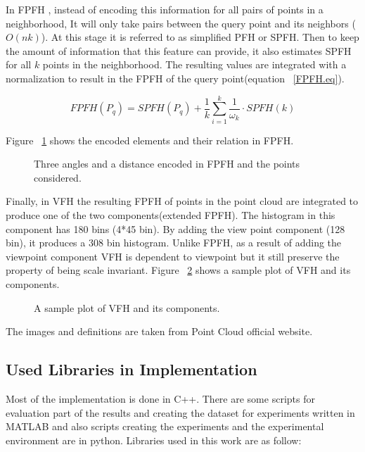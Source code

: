 In FPFH \cite{FPFH_Definition}, instead of encoding this information for all pairs of points in a neighborhood, It will only 
take pairs between the query point and its neighbors ($ O(n k) $). 
At this stage it is referred to as simplified PFH or SPFH. 
Then to keep the amount of information that this feature can provide, it also estimates SPFH for all $k$ points in the neighborhood.
The resulting values are integrated with a normalization to result in the FPFH of the query point(equation ~\ref{FPFH.eq}).

\begin{equation}
 \label{FPFH.eq}
 FPFH(P_{q}) = SPFH(P_{q}) + \frac{1}{k} \sum_{i=1}^k {\frac{1}{\omega_k}} \cdot SPFH(k)
\end{equation}


Figure  ~\ref{FPFH.figure} shows the encoded elements and their relation in FPFH.

\begin{figure}[t]
  \caption[FPFH elements.]
  {Three angles and a distance encoded in FPFH and the points considered.\cite{VFH_Definition}}
  \label{FPFH.figure}
\end{figure}

Finally, in VFH the resulting FPFH of points in the point cloud are integrated to produce one of the two components(extended FPFH).
The histogram in this component has 180 bins (4*45 bin).
By adding the view point component (128 bin), it produces a 308 bin histogram. 
Unlike FPFH, as a result of adding the viewpoint component VFH is dependent to viewpoint but it still preserve the property of 
being scale invariant. 
Figure ~\ref{VFH_plot.figure} shows a sample plot of VFH and its components.

\begin{figure}[t]
  \caption[VFH histogram]
  {A sample plot of VFH and its components.\cite{VFH_Definition}}
  \label{VFH_plot.figure}
\end{figure}

The images and definitions are taken from Point Cloud official website.

\subsection*{Used Libraries in Implementation}

Most of the implementation is done in C++. 
There are some scripts for evaluation part of the results and creating the dataset for experiments written in MATLAB and also 
scripts creating the experiments and the experimental environment are in python. 
Libraries used in this work are as follow:

